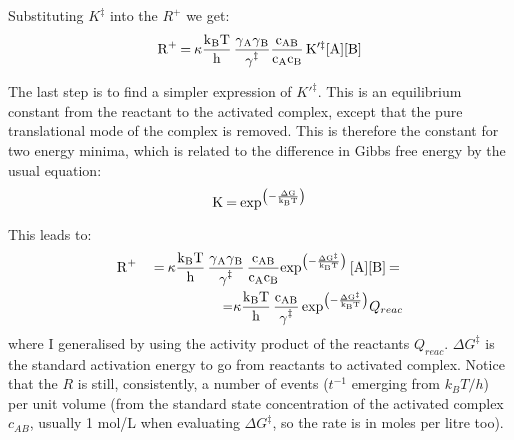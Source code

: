 \documentclass[12pt]{paper}    %
\begin{document}
Substituting $K^\ddag$ into the $R^+$ we get:
%
\begin{equation}
\ce{R+ = \kappa \frac{k_BT}{h} \frac{\gamma_A\gamma_B}{\gamma^\ddag}\frac{c_{AB}}{c_Ac_B} K}'^\ddag \ce{[A][B]}
\end{equation}
%

The last step is to find a simpler expression of $K'^\ddag$. This is an equilibrium constant from the reactant to the activated complex, except that the pure translational mode of the complex is removed. This is therefore the constant for two energy minima, which is related to the difference in Gibbs free energy by the usual equation:
%
\begin{equation}
\ce{K = exp^{\left( - \frac{\Delta G}{k_BT}\right)}}
\end{equation}
%

This leads to:
%
\begin{eqnarray}
\ce{R+ && = \kappa \frac{k_BT}{h} \frac{\gamma_A\gamma_B}{\gamma^\ddag} \frac{c_{AB}}{c_Ac_B}exp^{\left( - \frac{\Delta G^\ddag}{k_BT}\right)} [A][B]  = \nonumber \\
&& =\kappa \frac{k_BT}{h} \frac{c_{AB}}{\gamma^\ddag} exp^{\left( - \frac{\Delta G^\ddag}{k_BT}\right)}} Q_{reac}   \label{eqRp}
\end{eqnarray}
%
where I generalised by using the activity product of the reactants $Q_{reac}$. $\Delta G^\ddag$ is the standard activation energy to go from reactants to activated complex. Notice that the $R$ is still, consistently, a number of events ($t^{-1}$ emerging from $k_BT/h$) per unit volume (from the standard state concentration of the activated complex $c_{AB}$, usually 1 mol/L when evaluating $\Delta G^\ddag$, so the rate is in moles per litre too).
\end{document}
